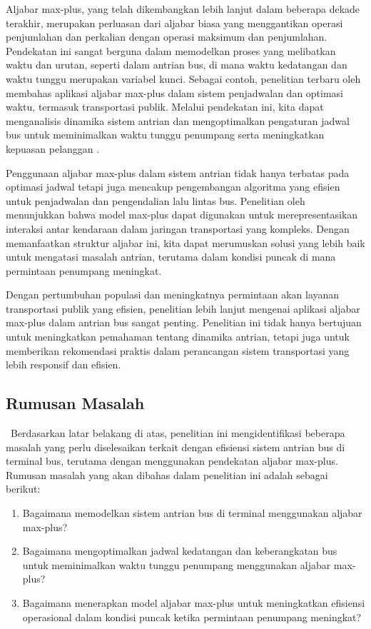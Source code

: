 \documentclass[12pt]{article}
\numberwithin{lemma}{subsection}
\begin{document}
Aljabar max-plus, yang telah dikembangkan lebih lanjut dalam beberapa dekade terakhir, merupakan perluasan dari aljabar biasa yang menggantikan operasi penjumlahan dan perkalian dengan operasi maksimum dan penjumlahan. Pendekatan ini sangat berguna dalam memodelkan proses yang melibatkan waktu dan urutan, seperti dalam antrian bus, di mana waktu kedatangan dan waktu tunggu merupakan variabel kunci. Sebagai contoh, penelitian terbaru oleh \citet{butkovic2010maxplus} membahas aplikasi aljabar max-plus dalam sistem penjadwalan dan optimasi waktu, termasuk transportasi publik. Melalui pendekatan ini, kita dapat menganalisis dinamika sistem antrian dan mengoptimalkan pengaturan jadwal bus untuk meminimalkan waktu tunggu penumpang serta meningkatkan kepuasan pelanggan \citep{butkovic2010maxplus}.

Penggunaan aljabar max-plus dalam sistem antrian tidak hanya terbatas pada optimasi jadwal tetapi juga mencakup pengembangan algoritma yang efisien untuk penjadwalan dan pengendalian lalu lintas bus. Penelitian oleh \citet{baccelli} menunjukkan bahwa model max-plus dapat digunakan untuk merepresentasikan interaksi antar kendaraan dalam jaringan transportasi yang kompleks. Dengan memanfaatkan struktur aljabar ini, kita dapat merumuskan solusi yang lebih baik untuk mengatasi masalah antrian, terutama dalam kondisi puncak di mana permintaan penumpang meningkat.

Dengan pertumbuhan populasi dan meningkatnya permintaan akan layanan transportasi publik yang efisien, penelitian lebih lanjut mengenai aplikasi aljabar max-plus dalam antrian bus sangat penting. Penelitian ini tidak hanya bertujuan untuk meningkatkan pemahaman tentang dinamika antrian, tetapi juga untuk memberikan rekomendasi praktis dalam perancangan sistem transportasi yang lebih responsif dan efisien.

\subsection{Rumusan Masalah}
$\,$\hskip 1cm Berdasarkan latar belakang di atas, penelitian ini mengidentifikasi beberapa masalah yang perlu diselesaikan terkait dengan efisiensi sistem antrian bus di terminal bus, terutama dengan menggunakan pendekatan aljabar max-plus. Rumusan masalah yang akan dibahas dalam penelitian ini adalah sebagai berikut:

\begin{enumerate}
    \item Bagaimana memodelkan sistem antrian bus di terminal menggunakan aljabar max-plus?
    \item Bagaimana mengoptimalkan jadwal kedatangan dan keberangkatan bus untuk meminimalkan waktu tunggu penumpang menggunakan aljabar max-plus?
    \item Bagaimana menerapkan model aljabar max-plus untuk meningkatkan efisiensi operasional dalam kondisi puncak ketika permintaan penumpang meningkat?
\end{enumerate}
\end{document}
